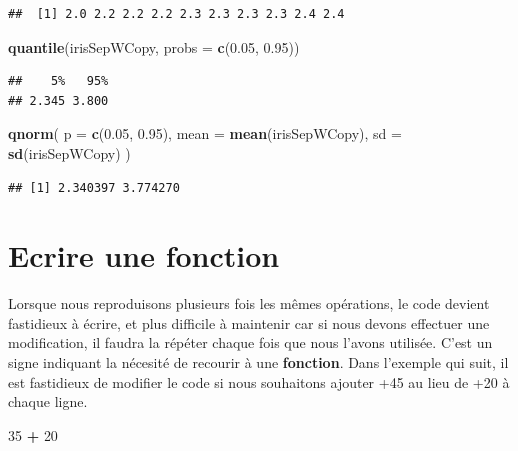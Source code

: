 \documentclass[]{book}
\newenvironment{Shaded}{\begin{snugshade}}{\end{snugshade}}
\newcommand{\DataTypeTok}[1]{\textcolor[rgb]{0.13,0.29,0.53}{#1}}
\newcommand{\DecValTok}[1]{\textcolor[rgb]{0.00,0.00,0.81}{#1}}
\newcommand{\FloatTok}[1]{\textcolor[rgb]{0.00,0.00,0.81}{#1}}
\newcommand{\KeywordTok}[1]{\textcolor[rgb]{0.13,0.29,0.53}{\textbf{#1}}}
\newcommand{\NormalTok}[1]{#1}
\newcommand{\OperatorTok}[1]{\textcolor[rgb]{0.81,0.36,0.00}{\textbf{#1}}}
\newcommand{\StringTok}[1]{\textcolor[rgb]{0.31,0.60,0.02}{#1}}
\begin{document}
\begin{verbatim}
##  [1] 2.0 2.2 2.2 2.2 2.3 2.3 2.3 2.3 2.4 2.4
\end{verbatim}

\begin{Shaded}
\begin{Highlighting}[]
\KeywordTok{quantile}\NormalTok{(irisSepWCopy, }\DataTypeTok{probs =} \KeywordTok{c}\NormalTok{(}\FloatTok{0.05}\NormalTok{, }\FloatTok{0.95}\NormalTok{))}
\end{Highlighting}
\end{Shaded}

\begin{verbatim}
##    5%   95% 
## 2.345 3.800
\end{verbatim}

\begin{Shaded}
\begin{Highlighting}[]
\KeywordTok{qnorm}\NormalTok{(}
  \DataTypeTok{p =} \KeywordTok{c}\NormalTok{(}\FloatTok{0.05}\NormalTok{, }\FloatTok{0.95}\NormalTok{), }
  \DataTypeTok{mean =} \KeywordTok{mean}\NormalTok{(irisSepWCopy), }
  \DataTypeTok{sd =} \KeywordTok{sd}\NormalTok{(irisSepWCopy)}
\NormalTok{)}
\end{Highlighting}
\end{Shaded}

\begin{verbatim}
## [1] 2.340397 3.774270
\end{verbatim}

\hypertarget{l015function}{%
\section{Ecrire une fonction}\label{l015function}}

Lorsque nous reproduisons plusieurs fois les mêmes opérations, le code devient fastidieux à écrire, et plus difficile à maintenir car si nous devons effectuer une modification, il faudra la répéter chaque fois que nous l'avons utilisée. C'est un signe indiquant la nécesité de recourir à une \textbf{fonction}. Dans l'exemple qui suit, il est fastidieux de modifier le code si nous souhaitons ajouter +45 au lieu de +20 à chaque ligne.

\begin{Shaded}
\begin{Highlighting}[]
\DecValTok{35} \OperatorTok{+}\StringTok{ }\DecValTok{20}
\end{Highlighting}
\end{Shaded}
\end{document}
